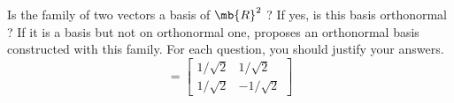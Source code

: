 \bexo


Is the family of two vectors a basis of $\mb{R}^2$ ? If yes, is this basis orthonormal ? If it is a basis but not on orthonormal one, proposes an orthonormal basis constructed with this family. For each question, you should justify your answers.
\begin{equation}
	[\bs{\Phi}]=\begin{bmatrix}
		{1/\sqrt{2}} & {1/\sqrt{2}} \\
		{1/\sqrt{2}} & {-1/\sqrt{2}}
	\end{bmatrix}
\end{equation}
\eexo
\solution{
 

}